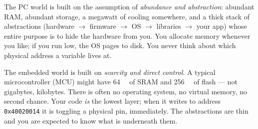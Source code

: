 \documentclass[11pt,a4paper,oneside]{book}
\newcommand{\code}[1]{\texttt{#1}}
\begin{document}
The PC world is built on the assumption of \emph{abundance and abstraction}:
abundant RAM, abundant storage, a megawatt of cooling somewhere, and a thick
stack of abstractions (hardware $\to$ firmware $\to$ OS $\to$ libraries $\to$
your app) whose entire purpose is to hide the hardware from you. You allocate
memory whenever you like; if you run low, the OS pages to disk. You never think
about which physical address a variable lives at.

The embedded world is built on \emph{scarcity and direct control}. A typical
microcontroller (MCU) might have \qty{64}{\kilo\byte} of SRAM and
\qty{256}{\kilo\byte} of flash --- not gigabytes, kilobytes. There is often no
operating system, no virtual memory, no second chance. Your code \emph{is} the
lowest layer; when it writes to address \code{0x40020014} it is toggling a
physical pin, immediately. The abstractions are thin and you are expected to
know what is underneath them.
\end{document}
